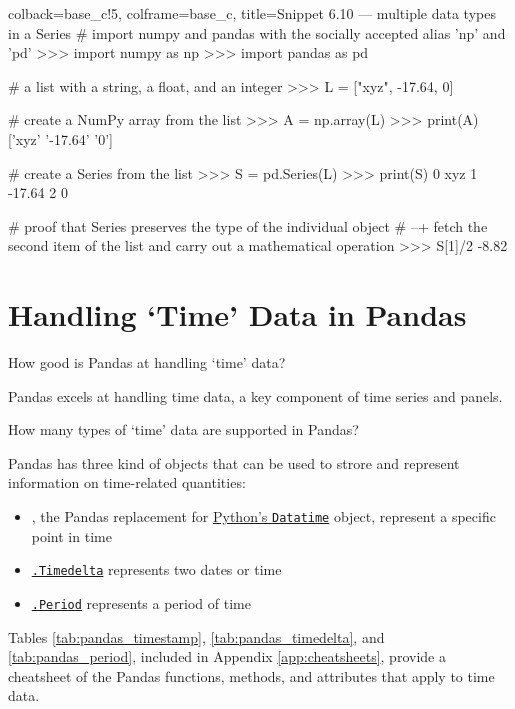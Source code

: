 \documentclass[a4paper,11pt]{book}
\numberwithin{figure}{chapter}
\numberwithin{table}{chapter}
\newcommand{\question}[1]{%
    \begin{tcolorbox}[colback=comp_c!10,colframe=comp_c,sidebyside align=top,width=\linewidth,before skip=1ex]
        #1
    \end{tcolorbox}
    \switchcolumn%
}
\newcommand{\note}[1]{%
    \begin{tcolorbox}[colback=white!0,colframe=white!10,width=\linewidth,before skip=1ex]
        #1
    \end{tcolorbox}
}
\begin{document}
\begin{pythoncode}[linenos=True]{colback=base_c!5, colframe=base_c, title=\sffamily Snippet 6.10 --- multiple data types in a Series}
# import numpy and pandas with the socially accepted alias 'np' and 'pd'
>>> import numpy as np
>>> import pandas as pd

# a list with a string, a float, and an integer
>>> L = ["xyz", -17.64, 0] 

# create a NumPy array from the list
>>> A = np.array(L)
>>> print(A)
['xyz' '-17.64' '0']

# create a Series from the list
>>> S = pd.Series(L)
>>> print(S)
0      xyz
1   -17.64
2        0

# proof that Series preserves the type of the individual object
# --+ fetch the second item of the list and carry out a mathematical operation
>>> S[1]/2
-8.82
\end{pythoncode}
\clearpage
\section{Handling `Time' Data in Pandas}

\begin{paracol}{2}
	\question{\raggedright How good is Pandas at handling `time' data?}
	\note{Pandas excels at handling time data, a key component of time series and panels.
	}
\end{paracol}

\begin{paracol}{2}
	\question{\raggedright How many types of `time' data are supported in Pandas?}
	\note{Pandas has three kind of objects that can be used to strore and represent information on time-related quantities:

	\begin{itemize}
		\item \href{https://pandas.pydata.org/docs/reference/api/pandas.Timestamp.html}{\textt{.Timestamp}}, the Pandas replacement for \href{https://docs.python.org/3/library/datetime.html}{Python's \texttt{Datatime}} object, represent a specific point in time 
		\item \href{https://pandas.pydata.org/docs/reference/api/pandas.Timedelta.html}{\texttt{.Timedelta}} represents two dates or time
		\item \href{https://pandas.pydata.org/docs/reference/api/pandas.Period.html}{\texttt{.Period}} represents a period of time
	\end{itemize}

	Tables \ref{tab:pandas_timestamp}, \ref{tab:pandas_timedelta}, and \ref{tab:pandas_period}, included in Appendix \ref{app:cheatsheets}, provide a cheatsheet of the Pandas functions, methods, and attributes that apply to time data.
	}
\end{paracol}
\end{document}

